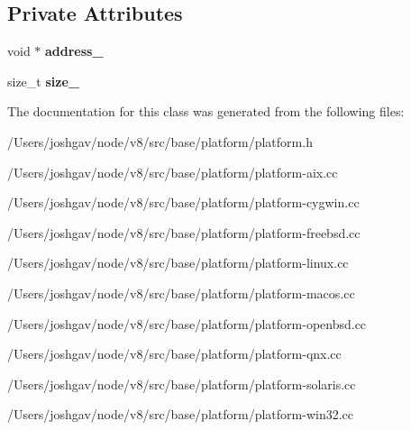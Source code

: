 \subsection*{Private Attributes}
\begin{DoxyCompactItemize}
\item 
void $\ast$ {\bfseries address\+\_\+}\hypertarget{classv8_1_1base_1_1_virtual_memory_a1750262ddf1917940b607fc490a0c9c6}{}\label{classv8_1_1base_1_1_virtual_memory_a1750262ddf1917940b607fc490a0c9c6}

\item 
size\+\_\+t {\bfseries size\+\_\+}\hypertarget{classv8_1_1base_1_1_virtual_memory_a9edb3312c5a8c38ed4f93938a8449f8a}{}\label{classv8_1_1base_1_1_virtual_memory_a9edb3312c5a8c38ed4f93938a8449f8a}

\end{DoxyCompactItemize}


The documentation for this class was generated from the following files\+:\begin{DoxyCompactItemize}
\item 
/\+Users/joshgav/node/v8/src/base/platform/platform.\+h\item 
/\+Users/joshgav/node/v8/src/base/platform/platform-\/aix.\+cc\item 
/\+Users/joshgav/node/v8/src/base/platform/platform-\/cygwin.\+cc\item 
/\+Users/joshgav/node/v8/src/base/platform/platform-\/freebsd.\+cc\item 
/\+Users/joshgav/node/v8/src/base/platform/platform-\/linux.\+cc\item 
/\+Users/joshgav/node/v8/src/base/platform/platform-\/macos.\+cc\item 
/\+Users/joshgav/node/v8/src/base/platform/platform-\/openbsd.\+cc\item 
/\+Users/joshgav/node/v8/src/base/platform/platform-\/qnx.\+cc\item 
/\+Users/joshgav/node/v8/src/base/platform/platform-\/solaris.\+cc\item 
/\+Users/joshgav/node/v8/src/base/platform/platform-\/win32.\+cc\end{DoxyCompactItemize}
